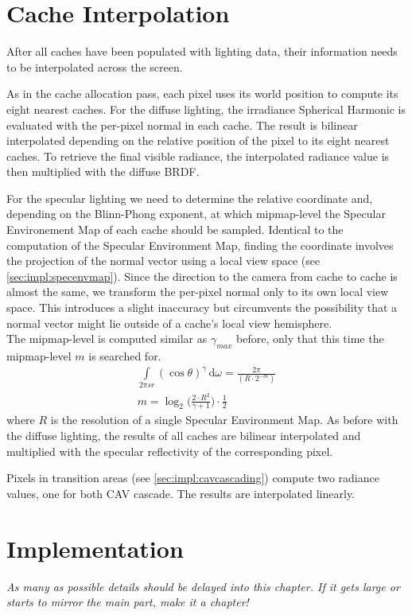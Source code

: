 \documentclass[thesis.tex]{subfiles}
\begin{document}
\section{Cache Interpolation}
After all caches have been populated with lighting data, their information needs to be interpolated across the screen.

As in the cache allocation pass, each pixel uses its world position to compute its eight nearest caches.
For the diffuse lighting, the irradiance Spherical Harmonic is evaluated with the per-pixel normal in each cache.
The result is bilinear interpolated depending on the relative position of the pixel to its eight nearest caches.
To retrieve the final visible radiance, the interpolated radiance value is then multiplied with the diffuse BRDF.

For the specular lighting we need to determine the relative coordinate and, depending on the Blinn-Phong exponent, at which mipmap-level the Specular Environement Map of each cache should be sampled.
Identical to the computation of the Specular Environment Map, finding the coordinate involves the projection of the normal vector using a local view space (see \autoref{sec:impl:specenvmap}).
Since the direction to the camera from cache to cache is almost the same, we transform the per-pixel normal only to its own local view space.
This introduces a slight inaccuracy but circumvents the possibility that a normal vector might lie outside of a cache's local view hemisphere.\\
The mipmap-level is computed similar as $\gamma_{max}$ before, only that this time the mipmap-level $m$ is searched for.
\begin{align}
\int\limits_{2\pi sr} (\cos\theta)^{\gamma}  \,\mathrm{d}\omega = \frac{2\pi}{(R \cdot 2^{-m})}\\
m = \log_2 \Big(\frac{2 \cdot R^2}{\gamma + 1} \Big) \cdot \frac{1}{2}
\end{align}
where $R$ is the resolution of a single Specular Environment Map.
As before with the diffuse lighting, the results of all caches are bilinear interpolated and multiplied with the specular reflectivity of the corresponding pixel.

Pixels in transition areas (see \autoref{sec:impl:cavcascading}) compute two radiance values, one for both CAV cascade.
The results are interpolated linearly.

\section{Implementation}
\emph{As many as possible details should be delayed into this chapter. If it gets large or starts to mirror the main part, make it a chapter!}
\end{document}
